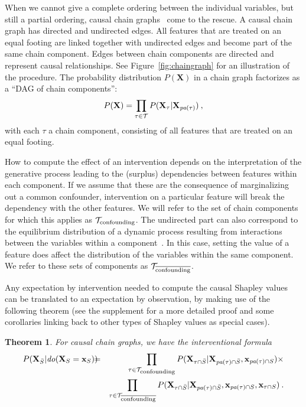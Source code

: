 \documentclass{article}
\newcommand{\vX}{\mathbf{X}}
\newcommand{\vx}{\mathbf{x}}
\newcommand{\dodo}{\mathit{do}}
\newcommand{\lvdo}[1]{\dodo(\vX_{#1} = \vx_{#1})}
\newcommand{\spa}{\mathop{\textit{\scriptsize pa}}}
\newcommand{\onder}[2]{{#1}_{\mbox{\scriptsize #2}}}
\newcommand{\isequal}{\hspace*{-2.5mm} & = & \hspace*{-2.5mm}}
\newcommand{\chaincomponents}{{\cal T}}
\newtheorem{theorem}{Theorem}
\begin{document}
When we cannot give a complete ordering between the individual variables, but still a partial ordering, causal chain graphs~\cite{lauritzen2002chain} come to the rescue. A causal chain graph has directed and undirected edges. All features that are treated on an equal footing are linked together with undirected edges and become part of the same chain component. Edges between chain components are directed and represent causal relationships. See Figure~\ref{fig:chaingraph} for an illustration of the procedure. The probability distribution $P(\vX)$ in a chain graph factorizes as a ``DAG of chain components'':
\[
P(\vX) = \prod_{\tau \in \chaincomponents} P(\vX_\tau|\vX_{\spa(\tau)}) \: ,
\]
with each $\tau$ a chain component, consisting of all features that are treated on an equal footing.

How to compute the effect of an intervention depends on the interpretation of the generative process leading to the (surplus) dependencies between features within each component. If we assume that these are the consequence of marginalizing out a common confounder, intervention on a particular feature will break the dependency with the other features. We will refer to the set of chain components for which this applies as $\onder{\chaincomponents}{confounding}$. The undirected part can also correspond to the equilibrium distribution of a dynamic process resulting from interactions between the variables within a component~\cite{lauritzen2002chain}. In this case, setting the value of a feature does affect the distribution of the variables within the same component. We refer to these sets of components as $\chaincomponents_{\overline{\textrm{\upshape \scriptsize confounding}}}$.

Any expectation by intervention needed to compute the causal Shapley values can be translated to an expectation by observation, by making use of the following theorem (see the supplement for a more detailed proof and some corollaries linking back to other types of Shapley values as special cases).
\begin{theorem}
For causal chain graphs, we have the interventional formula 
\begin{eqnarray}
P(\vX_{\bar{S}}|\lvdo{S}) \isequal \prod_{\tau \in \chaincomponents_{\textrm{\upshape \scriptsize confounding}}} P(\vX_{\tau \cap \bar{S}}|\vX_{\spa(\tau)  \cap \bar{S}},\vx_{\spa(\tau) \cap S}) \times \nonumber \\
&& \prod_{\tau \in \chaincomponents_{\overline{\textrm{\upshape \scriptsize confounding}}}} P(\vX_{\tau \cap \bar{S}}|\vX_{\spa(\tau) \cap \bar{S}},\vx_{\spa(\tau) \cap S},\vx_{\tau \cap S}) \: .
\label{eq:chaininterventional}
\end{eqnarray}
\end{theorem}
\end{document}
